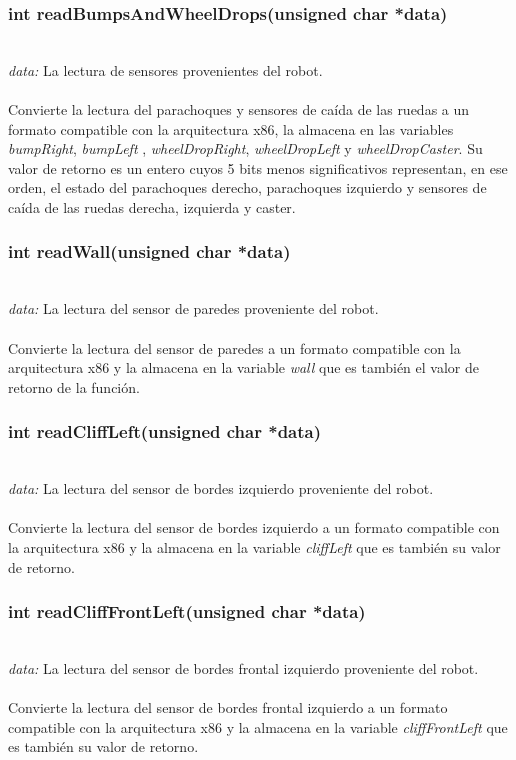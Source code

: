 \documentclass[letterpaper]{book}
\begin{document}
\subsubsection{int readBumpsAndWheelDrops(unsigned char *data)}\mbox{}\\
\emph{data: }La lectura de sensores provenientes del robot.\\\\
Convierte la lectura del  parachoques y sensores de caída de las ruedas a un formato compatible con la arquitectura x86, la almacena en las variables \emph{bumpRight}, \emph{bumpLeft} , \emph{wheelDropRight}, \emph{wheelDropLeft} y \emph{wheelDropCaster}. Su valor de retorno es un entero cuyos 5 bits menos significativos representan, en ese orden, el estado del parachoques derecho, parachoques izquierdo y sensores de caída de las ruedas derecha, izquierda y caster.\\ 

\subsubsection{int readWall(unsigned char *data)}\mbox{}\\
\emph{data: }La lectura del sensor de paredes proveniente del robot.\\\\
Convierte la lectura del sensor de paredes a un formato compatible con la arquitectura x86 y la almacena en la variable \emph{wall} que es también el valor de retorno de la función.\\ 

\subsubsection{int readCliffLeft(unsigned char *data)}\mbox{}\\
\emph{data: }La lectura del sensor de bordes izquierdo proveniente del robot.\\\\
Convierte la lectura del sensor de bordes izquierdo a un formato compatible con la arquitectura x86 y la almacena en la variable \emph{cliffLeft} que es también su valor de retorno.\\ 

\subsubsection{int readCliffFrontLeft(unsigned char *data)}\mbox{}\\
\emph{data: }La lectura del sensor de bordes frontal izquierdo proveniente del robot.\\\\
Convierte la lectura del sensor de bordes frontal izquierdo a un formato compatible con la arquitectura x86 y la almacena en la variable \emph{cliffFrontLeft} que es también su valor de retorno.\\ 
\end{document}
